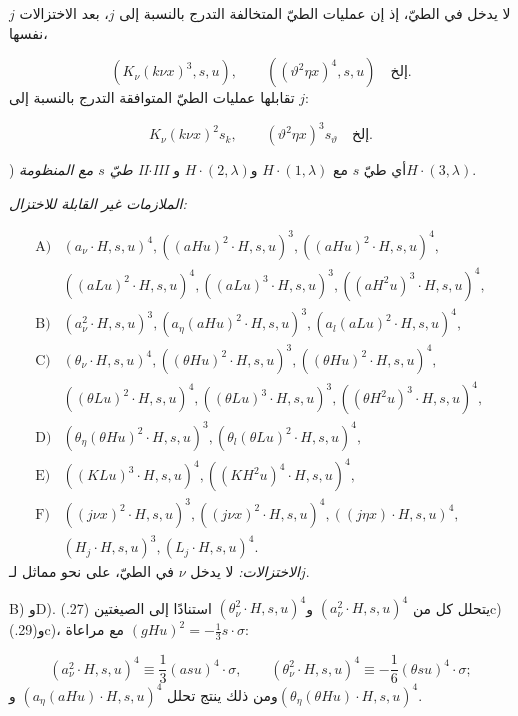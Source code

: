 \documentclass[11pt]{article}
\begin{document}
$j$ لا يدخل في الطيّ، إذ إن عمليات الطيّ المتخالفة التدرج بالنسبة إلى $j$، بعد الاختزالات نفسها،

\[
(K_\nu(k\nu x)^3,s,u),\qquad ((\vartheta^2\eta x)^4,s,u)\quad\text{إلخ.}
\]
تقابلها عمليات الطيّ المتوافقة التدرج بالنسبة إلى $j$:

\[
K_\nu(k\nu x)^2s_k,
\qquad (\vartheta^2\eta x)^3s_\vartheta\quad\text{إلخ.}
\]

) \emph{طيّ $s$ مع المنظومة II$\cdot$III}
أي طيّ $s$ مع $H\cdot(1,\lambda)$ و$H\cdot(2,\lambda)$ و$H\cdot(3,\lambda)$.

\noindent\emph{الملازمات غير القابلة للاختزال:}

\[
\begin{array}{rl}
\text{A)}&(a_\nu\cdot H,s,u)^4,
((aHu)^2\cdot H,s,u)^3,
((aHu)^2\cdot H,s,u)^4,\\[0.25em]
&((aLu)^2\cdot H,s,u)^4,
((aLu)^3\cdot H,s,u)^3,
((aH^2u)^3\cdot H,s,u)^4,\\[0.45em]
\text{B)}&(a_\nu^2\cdot H,s,u)^3,
(a_\eta(aHu)^2\cdot H,s,u)^3,
(a_l(aLu)^2\cdot H,s,u)^4,\\[0.45em]
\text{C)}&(\theta_\nu\cdot H,s,u)^4,
((\theta Hu)^2\cdot H,s,u)^3,
((\theta Hu)^2\cdot H,s,u)^4,\\[0.25em]
&((\theta Lu)^2\cdot H,s,u)^4,
((\theta Lu)^3\cdot H,s,u)^3,
((\theta H^2u)^3\cdot H,s,u)^4,\\[0.45em]
\text{D)}&(\theta_\eta(\theta Hu)^2\cdot H,s,u)^3,
(\theta_l(\theta Lu)^2\cdot H,s,u)^4,\\[0.45em]
\text{E)}&((KLu)^3\cdot H,s,u)^4,
((KH^2u)^4\cdot H,s,u)^4,\\[0.45em]
\text{F)}&((j\nu x)^2\cdot H,s,u)^3,
((j\nu x)^2\cdot H,s,u)^4,
((j\eta x)\cdot H,s,u)^4,\\[0.25em]
&(H_j\cdot H,s,u)^3,
(L_j\cdot H,s,u)^4.
\end{array}
\]
\noindent\emph{الاختزالات:} لا يدخل $\nu$ في الطيّ، على نحو مماثل لـ$j$.

B) وD). يتحلل كل من $(a_\nu^2\cdot H,s,u)^4$ و$(\theta_\nu^2\cdot H,s,u)^4$ استنادًا إلى الصيغتين (27.)c) و(29.)c)، مع مراعاة $(gHu)^2=-\frac13s\cdot\sigma$:

\[
(a_\nu^2\cdot H,s,u)^4\equiv\frac13(asu)^4\cdot\sigma,
\qquad
(\theta_\nu^2\cdot H,s,u)^4\equiv-\frac16(\theta su)^4\cdot\sigma;
\]
ومن ذلك ينتج تحلل $(a_\eta(aHu)\cdot H,s,u)^4$ و$(\theta_\eta(\theta Hu)\cdot H,s,u)^4$.
\end{document}

